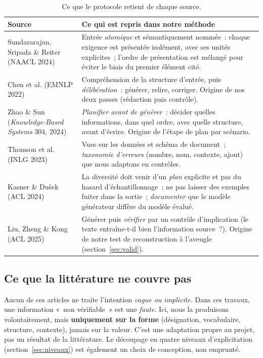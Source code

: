 \documentclass[11pt,a4paper]{article}
\begin{document}
\begin{table}[h]
\centering
\caption{Ce que le protocole retient de chaque source.}\label{tab:lit}
\small
\begin{tabularx}{\linewidth}{@{}p{3.6cm}X@{}}
\toprule
Source & Ce qui est repris dans notre méthode \\
\midrule
Sundararajan, Sripada \& Reiter (NAACL 2024) & Entrée \emph{atomique} et sémantiquement nommée~: chaque exigence est présentée isolément, avec ses unités explicites~; l'ordre de présentation est mélangé pour éviter le biais du premier élément cité. \\
Chen et al. (EMNLP 2022) & Compréhension de la structure d'entrée, puis \emph{délibération}~: générer, relire, corriger. Origine de nos deux passes (rédaction puis contrôle). \\
Zhao \& Sun (\emph{Knowledge-Based Systems} 304, 2024) & \emph{Planifier avant de générer}~: décider quelles informations, dans quel ordre, avec quelle structure, avant d'écrire. Origine de l'étape de plan par scénario. \\
Thomson et al. (INLG 2023) & Vues sur les données et schéma de document~; \emph{taxonomie d'erreurs} (nombre, nom, contexte, ajout) que nous adaptons en contrôles. \\
Kasner \& Dušek (ACL 2024) & La diversité doit venir d'un \emph{plan} explicite et pas du hasard d'échantillonnage~; ne pas laisser des exemples fuiter dans la sortie~; \emph{documenter} que le modèle générateur diffère du modèle évalué. \\
Liu, Zheng \& Kong (ACL 2025) & Générer puis \emph{vérifier} par un contrôle d'implication (le texte entraîne-t-il bien l'information source~?). Origine de notre test de reconstruction à l'aveugle (section~\ref{sec:valid}). \\
\bottomrule
\end{tabularx}
\end{table}

\subsection{Ce que la littérature ne couvre pas}

Aucun de ces articles ne traite l'intention \emph{vague ou implicite}. Dans ces travaux, une information «~non vérifiable~» est une \emph{faute}. Ici, nous la produisons volontairement, mais \textbf{uniquement sur la forme} (désignation, vocabulaire, structure, contexte), jamais sur la valeur. C'est une adaptation propre au projet, pas un résultat de la littérature. Le découpage en quatre niveaux d'explicitation (section~\ref{sec:niveaux}) est également un choix de conception, non emprunté.
\end{document}
